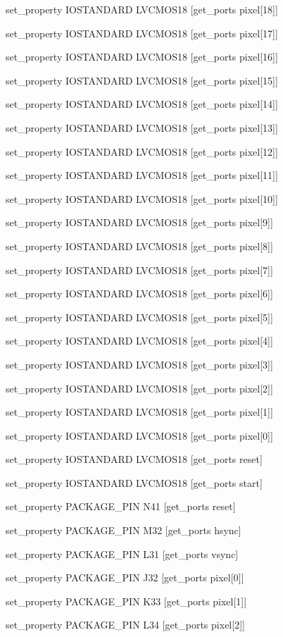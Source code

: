 set\_property IOSTANDARD LVCMOS18 [get\_ports {pixel[18]}]

set\_property IOSTANDARD LVCMOS18 [get\_ports {pixel[17]}]

set\_property IOSTANDARD LVCMOS18 [get\_ports {pixel[16]}]

set\_property IOSTANDARD LVCMOS18 [get\_ports {pixel[15]}]

set\_property IOSTANDARD LVCMOS18 [get\_ports {pixel[14]}]

set\_property IOSTANDARD LVCMOS18 [get\_ports {pixel[13]}]

set\_property IOSTANDARD LVCMOS18 [get\_ports {pixel[12]}]

set\_property IOSTANDARD LVCMOS18 [get\_ports {pixel[11]}]

set\_property IOSTANDARD LVCMOS18 [get\_ports {pixel[10]}]

set\_property IOSTANDARD LVCMOS18 [get\_ports {pixel[9]}]

set\_property IOSTANDARD LVCMOS18 [get\_ports {pixel[8]}]

set\_property IOSTANDARD LVCMOS18 [get\_ports {pixel[7]}]

set\_property IOSTANDARD LVCMOS18 [get\_ports {pixel[6]}]

set\_property IOSTANDARD LVCMOS18 [get\_ports {pixel[5]}]

set\_property IOSTANDARD LVCMOS18 [get\_ports {pixel[4]}]

set\_property IOSTANDARD LVCMOS18 [get\_ports {pixel[3]}]

set\_property IOSTANDARD LVCMOS18 [get\_ports {pixel[2]}]

set\_property IOSTANDARD LVCMOS18 [get\_ports {pixel[1]}]

set\_property IOSTANDARD LVCMOS18 [get\_ports {pixel[0]}]

set\_property IOSTANDARD LVCMOS18 [get\_ports reset]

set\_property IOSTANDARD LVCMOS18 [get\_ports start]

set\_property PACKAGE\_PIN N41 [get\_ports reset]

set\_property PACKAGE\_PIN M32 [get\_ports hsync]

set\_property PACKAGE\_PIN L31 [get\_ports vsync]

set\_property PACKAGE\_PIN J32 [get\_ports {pixel[0]}]

set\_property PACKAGE\_PIN K33 [get\_ports {pixel[1]}]

set\_property PACKAGE\_PIN L34 [get\_ports {pixel[2]}]

